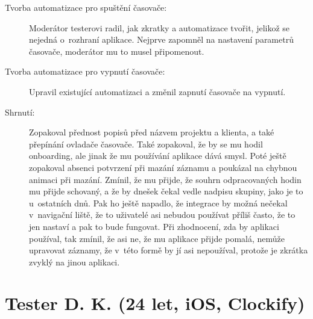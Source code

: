 \begin{description}
\item[Tvorba automatizace pro spuštění časovače:] Moderátor testerovi radil, jak zkratky a automatizace tvořit, jelikož se nejedná o~rozhraní aplikace. Nejprve zapomněl na nastavení parametrů časovače, moderátor mu to musel připomenout.
\item[Tvorba automatizace pro vypnutí časovače:] Upravil existující automatizaci a změnil zapnutí časovače na vypnutí.
\item[Shrnutí:] Zopakoval přednost popisů před názvem projektu a klienta, a také přepínání ovladače časovače. Také zopakoval, že by se mu hodil onboarding, ale jinak že mu používání aplikace dává smysl. Poté ještě zopakoval absenci potvrzení při mazání záznamu a poukázal na chybnou animaci při mazání. Zmínil, že mu přijde, že souhrn odpracovaných hodin mu přijde schovaný, a že by dnešek čekal vedle nadpisu skupiny, jako je to u~ostatních dnů. Pak ho ještě napadlo, že integrace by možná nečekal v~navigační liště, že to uživatelé asi nebudou používat příliš často, že to jen nastaví a pak to bude fungovat. Při zhodnocení, zda by aplikaci používal, tak zmínil, že asi ne, že mu aplikace přijde pomalá, nemůže upravovat záznamy, že v~této formě by jí asi nepoužíval, protože je zkrátka zvyklý na jinou aplikaci.
\end{description}

\section*{Tester D. K. (24 let, iOS, Clockify)}

